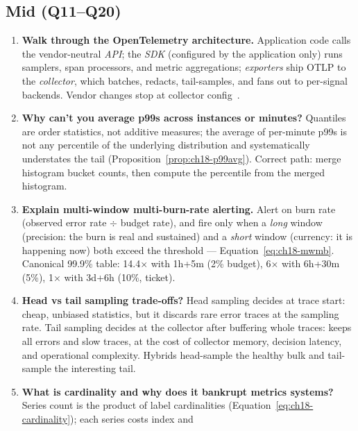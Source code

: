 \subsection*{Mid (Q11--Q20)}
\begin{enumerate}[label=\textbf{Q\arabic*.}, leftmargin=1.6cm, start=11]
  \item \textbf{Walk through the OpenTelemetry architecture.}
        Application code calls the vendor-neutral \emph{API}; the
        \emph{SDK} (configured by the application only) runs samplers, span
        processors, and metric aggregations; \emph{exporters} ship OTLP to
        the \emph{collector}, which batches, redacts, tail-samples, and
        fans out to per-signal backends. Vendor changes stop at collector
        config~\cite{opentelemetrydocs}.
  \item \textbf{Why can't you average p99s across instances or minutes?}
        Quantiles are order statistics, not additive measures; the average
        of per-minute p99s is not any percentile of the underlying
        distribution and systematically understates the tail
        (Proposition~\ref{prop:ch18-p99avg}). Correct path: merge histogram
        bucket counts, then compute the percentile from the merged
        histogram.
  \item \textbf{Explain multi-window multi-burn-rate alerting.}
        Alert on burn rate (observed error rate $\div$ budget rate), and
        fire only when a \emph{long} window (precision: the burn is real
        and sustained) and a \emph{short} window (currency: it is happening
        now) both exceed the threshold --- Equation~\eqref{eq:ch18-mwmb}.
        Canonical 99.9\% table: 14.4$\times$ with 1h+5m (2\% budget), 6$\times$
        with 6h+30m (5\%), 1$\times$ with 3d+6h (10\%, ticket).
  \item \textbf{Head vs tail sampling trade-offs?}
        Head sampling decides at trace start: cheap, unbiased statistics,
        but it discards rare error traces at the sampling rate. Tail
        sampling decides at the collector after buffering whole traces:
        keeps all errors and slow traces, at the cost of collector memory,
        decision latency, and operational complexity. Hybrids head-sample
        the healthy bulk and tail-sample the interesting tail.
  \item \textbf{What is cardinality and why does it bankrupt metrics
        systems?}
        Series count is the product of label cardinalities
        (Equation~\eqref{eq:ch18-cardinality}); each series costs index and

\end{enumerate}
